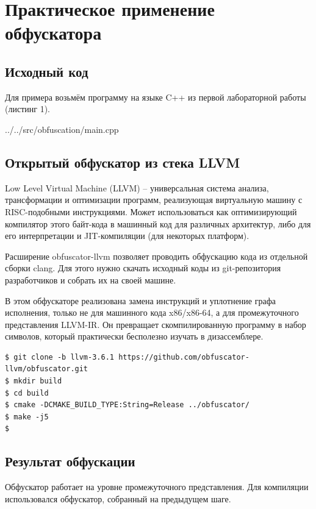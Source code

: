 \newpage
\section{Практическое применение обфускатора}

\subsection{Исходный код}

Для примера возьмём программу на языке C++ из первой лабораторной работы (листинг 1).


{../../src/obfuscation/main.cpp}

\subsection{Открытый обфускатор из стека LLVM}

Low Level Virtual Machine (LLVM) -- универсальная система анализа, трансформации и оптимизации программ, реализующая виртуальную машину с RISC-подобными инструкциями. Может использоваться как оптимизирующий компилятор этого байт-кода в машинный код для различных архитектур, либо для его интерпретации и JIT-компиляции (для некоторых платформ).

Расширение obfuscator-llvm позволяет проводить обфускацию кода из отдельной сборки clang. Для этого нужно скачать исходный коды из git-репозитория разработчиков и собрать их на своей машине.

В этом обфускаторе реализована замена инструкций и уплотнение графа исполнения, только не для машинного кода x86/x86-64, а для промежуточного представления LLVM-IR. Он превращает скомпилированную программу в набор символов, который практически бесполезно изучать в дизассемблере.

\begin{Verbatim}[frame=single]
$ git clone -b llvm-3.6.1 https://github.com/obfuscator-llvm/obfuscator.git
$ mkdir build
$ cd build
$ cmake -DCMAKE_BUILD_TYPE:String=Release ../obfuscator/
$ make -j5
$
\end{Verbatim}

\subsection{Результат обфускации}

Обфускатор работает на уровне промежуточного представления. Для компиляции использовался обфускатор, собранный на предыдущем шаге.


